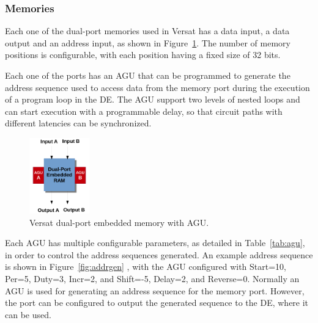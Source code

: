 \subsubsection{Memories}
\label{subsubsection:memories}

Each one of the dual-port memories used in Versat has a data input, a data
output and an address input, as shown in Figure~\ref{fig:memory}. The number of
memory positions is configurable, with each position having a fixed size of 32
bits.

Each one of the ports has an \ac{AGU} that can be programmed to generate the
address sequence used to access data from the memory port during the execution
of a program loop in the \ac{DE}. The \ac{AGU} support two levels of nested
loops and can start execution with a programmable delay, so that circuit paths
with different latencies can be synchronized.

\begin{figure}[!htb]
	\centering
	\includegraphics[width=0.23\textwidth]{Figures/memory.png}
	\caption{Versat dual-port embedded memory with AGU.}
	\label{fig:memory}
\end{figure}

Each \ac{AGU} has multiple configurable parameters, as detailed in
Table~\ref{tab:agu}, in order to control the address sequences generated. An
example address sequence is shown in Figure~\ref{fig:addrgen} , with the
\ac{AGU} configured with Start=10, Per=5, Duty=3, Incr=2, and Shift=-5, Delay=2,
and Reverse=0. Normally an \ac{AGU} is used for generating an address sequence
for the memory port. However, the port can be configured to output the generated
sequence to the DE, where it can be used.

